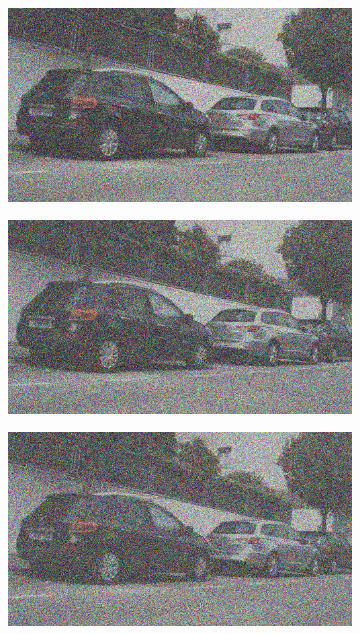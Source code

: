\documentclass[a4paper]{ctexart}
\begin{document}
\begin{figure}[htbp]
\begin{subfigure}{0.08\textwidth}
			\label{fig：Gamma=0.5, Gauss Noise = 0.7}
		\end{subfigure}
		\begin{subfigure}{0.08\textwidth}
			\captionsetup{font=scriptsize}
			\includegraphics[width=\linewidth]{picture/Edge Detection/degrade/RGB_001 Gamma=0.5, Gauss Noise=0.8}
			\label{fig：Gamma=0.5, Gauss Noise = 0.8}
		\end{subfigure}
		\begin{subfigure}{0.08\textwidth}
			\captionsetup{font=scriptsize}
			\includegraphics[width=\linewidth]{picture/Edge Detection/degrade/RGB_001 Gamma=0.5, Gauss Noise=0.9}
			\label{fig：Gamma=0.5, Gauss Noise = 0.9}
		\end{subfigure}
		\begin{subfigure}{0.08\textwidth}
			\captionsetup{font=scriptsize}
			\includegraphics[width=\linewidth]{picture/Edge Detection/degrade/RGB_001 Gamma=0.5, Gauss Noise=1.0}

\end{subfigure}
\end{figure}
\end{document}
